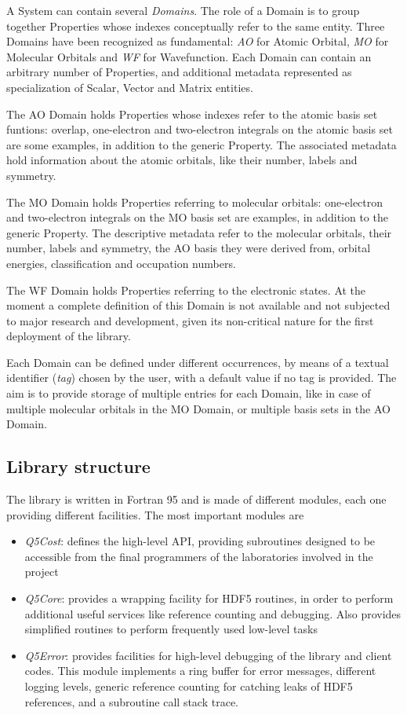 A System can contain several \textit{Domains}. The role of a Domain is to
group together Properties whose indexes conceptually refer to the
same entity. Three Domains have been recognized as fundamental: \textit{AO}
for Atomic Orbital, \textit{MO} for Molecular Orbitals and \textit{WF} for
Wavefunction.  Each Domain can contain an arbitrary number of Properties, and
additional metadata represented as specialization of Scalar, Vector and Matrix
entities.

The AO Domain holds Properties whose indexes refer to the atomic basis set
funtions: overlap, one-electron and two-electron integrals on the atomic
basis set are some examples, in addition to the generic Property. The
associated metadata hold information about the atomic orbitals, like their
number, labels and symmetry.

The MO Domain holds Properties referring to molecular orbitals:
one-electron and two-electron integrals on the MO basis set are examples, in
addition to the generic Property. The descriptive metadata refer to the
molecular orbitals, their number, labels and symmetry, the AO
basis they were derived from, orbital energies, classification and
occupation numbers.

The WF Domain holds Properties referring to the electronic states. At the
moment a complete definition of this Domain is not available and not
subjected to major research and development, given its non-critical nature
for the first deployment of the library.

Each Domain can be defined under different occurrences, by means of a textual
identifier (\textit{tag}) chosen by the user, with a default value if no tag is
provided. The aim is to provide storage of multiple entries for each Domain,
like in case of multiple molecular orbitals in the MO Domain, or multiple
basis sets in the AO Domain.

\subsection*{Library structure}

The library is written in Fortran 95 and is made of different modules, each
one providing different facilities. The most important modules are

\begin{itemize}
\item \textit{Q5Cost}: defines the high-level API, providing
subroutines designed to be accessible from the final programmers of the
laboratories involved in the project
\item \textit{Q5Core}: provides a wrapping facility for HDF5 routines, in order to
perform additional useful services like reference counting and debugging.
Also provides simplified routines to perform frequently used low-level
tasks
\item \textit{Q5Error}: provides facilities for high-level debugging of the
library and client codes. This module implements a ring buffer for error
messages, different logging levels, generic reference counting for catching
leaks of HDF5 references, and a subroutine call stack trace.
\end{itemize}

